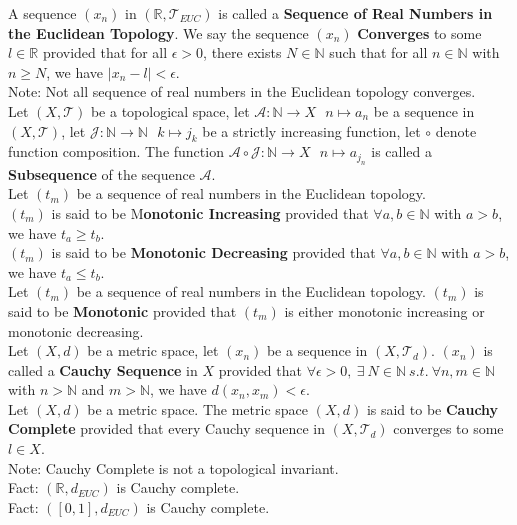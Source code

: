 \documentclass[11pt]{article}
\newcommand{\R}{\mathbb{R}}
\newcommand{\N}{\mathbb{N}}
\newcommand{\A}{\mathcal{A}}
\newcommand{\J}{\mathcal{J}}
\newcommand{\T}{\mathcal{T}}
\newcommand{\note}{\color{gray}Note: \color{black}}
\newcommand{\fact}{\color{gray}Fact: \color{black}}
\begin{document}
		\noindent A sequence $(x_n)$ in $(\R, \T_{EUC})$ is called a \textbf{Sequence of Real Numbers in the Euclidean Topology}. We say the sequence $(x_n)$ \textbf{Converges} to some $l \in \R$ provided that for all $\epsilon >0$, there exists $N \in \N$ such that for all $n \in \N$ with $n \geq N$, we have $|x_n -l|<\epsilon$.\\
		\note Not all sequence of real numbers in the Euclidean topology converges.\\
		
		\noindent Let $(X,\T)$ be a topological space, let $\A :\N \to X \ \ \ n \mapsto a_n$ be a sequence in $(X,\T)$, let \mbox{$\J :\N \to \N \ \ \ k \mapsto j_k$} be a strictly increasing function, let $\circ$ denote function composition. The function \mbox{$\A \circ \J: \N \to X \ \ \ n \mapsto a_{j_n}$} is called a \textbf{Subsequence} of the sequence $\A$.\\
		
		\noindent Let $(t_m)$ be a sequence of real numbers in the Euclidean topology.	\\$(t_m)$ is said to be M\textbf{onotonic Increasing} provided that $\forall a,b \in \N$ with $a>b$, we have $t_a \geq t_b$.\\ $(t_m)$ is said to be \textbf{Monotonic Decreasing} provided that $\forall a,b \in \N$ with $a>b$, we have $t_a \leq t_b$.\\
		
		\noindent Let $(t_m)$ be a sequence of real numbers in the Euclidean topology. $(t_m)$ is said to be \textbf{Monotonic} provided that $(t_m)$ is either monotonic increasing or monotonic decreasing.\\
		
		\noindent Let $(X,d)$ be a metric space, let $(x_n)$ be a sequence in $(X,\T_d)$. $(x_n)$ is called a \textbf{Cauchy Sequence} in $X$ provided that $\forall \epsilon >0, \ \exists \ N \in \N \ s.t. \ \forall n,m \in \N$ with $n>\N$ and $m>\N$, we have $d(x_n,x_m)<\epsilon$.\\
		
		\noindent Let $(X,d)$ be a metric space. The metric space $(X,d)$ is said to be \textbf{Cauchy Complete} provided that every Cauchy sequence in $(X,\T_d)$ converges to some $l \in X$.\\
		\note Cauchy Complete is not a topological invariant.\\
		\fact $(\R,d_{EUC})$ is Cauchy complete.\\
		\fact $([0,1],d_{EUC})$ is Cauchy complete.\\
	
\end{document}

